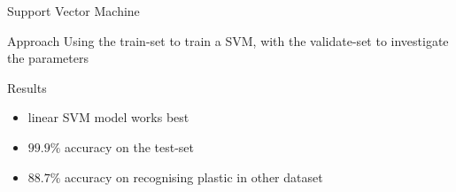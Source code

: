 \documentclass{beamer}
\begin{document}
    \begin{frame}{Support Vector Machine}
    \begin{block}{Approach}
        Using the train-set to train a SVM, with the validate-set to investigate the parameters
    \end{block}
    \begin{block}{Results}
        \begin{itemize}
        \pause
        \item linear SVM model works best
        \item $99.9\%$ accuracy on the test-set
        \item $88.7\%$ accuracy on recognising plastic in other dataset
        \end{itemize}
    \end{block}
    \end{frame}
\end{document}
